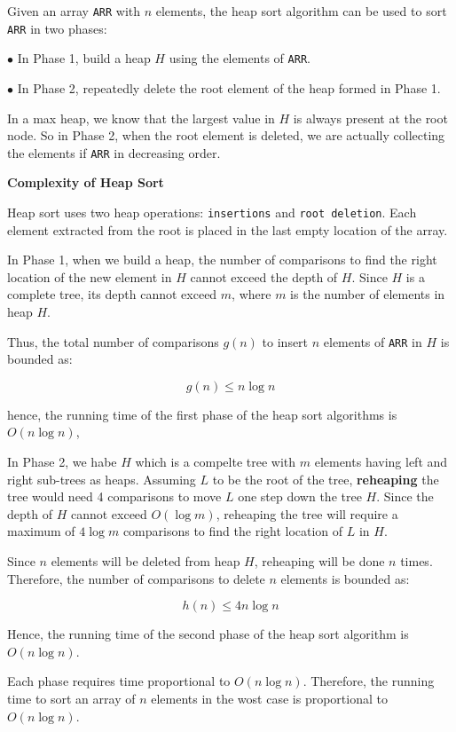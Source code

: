 \vskip 1mm
Given an array {\tt ARR} with $n$ elements, the heap sort algorithm can be used to sort {\tt ARR} in two phases:

\vskip 3mm
\qquad$\bullet$ In Phase 1, build a heap $H$ using the elements of {\tt ARR}.

\vskip 3mm
\qquad$\bullet$ In Phase 2, repeatedly delete the root element of the heap formed in Phase 1.

\vskip 1mm
In a max heap, we know that the largest value in $H$ is always present at the root node. So in Phase 2, when the root element is deleted, we are actually collecting the elements if {\tt ARR} in decreasing order.

\vskip 3mm
{\bf Complexity of Heap Sort}

\vskip 1mm
Heap sort uses two heap operations: {\tt insertions} and {\tt root deletion}. Each element extracted from the root is placed in the last empty location of the array.

\vskip 1mm
In Phase 1, when we build a heap, the number of comparisons to find the right location of the new element in $H$ cannot exceed the depth of $H$. Since $H$ is a complete tree, its depth cannot exceed $m$, where $m$ is the number of elements in heap $H$.

\vskip 1mm
Thus, the total number of comparisons $g(n)$ to insert $n$ elements of {\tt ARR} in $H$ is bounded as:

$$g(n)\leq n\log n$$

hence, the running time of the first phase of the heap sort algorithms is $O(n\log n)$,

\vskip 1mm
In Phase 2, we habe $H$ which is a compelte tree with $m$ elements having left and right sub-trees as heaps. Assuming $L$ to be the root of the tree, {\bf reheaping} the tree would need 4 comparisons to move $L$ one step down the tree $H$. Since the depth of $H$ cannot exceed $O(\log m)$, reheaping the tree will require a maximum of $4\log m$ comparisons to find the right location of $L$ in $H$.

\vskip 1mm
Since $n$ elements will be deleted from heap $H$, reheaping will be done $n$ times. Therefore, the number of comparisons to delete $n$ elements is bounded as:

$$h(n)\leq 4n\log n$$

Hence, the running time of the second phase of the heap sort algorithm is $O(n\log n)$.

\vskip 1mm
Each phase requires time proportional to $O(n\log n)$. Therefore, the running time to sort an array of $n$ elements in the wost case is proportional to $O(n\log n)$.

